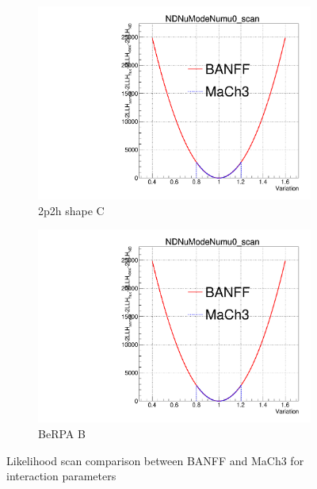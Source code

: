 \begin{figure}[h]
	\begin{subfigure}[t]{0.24\textwidth}
		\includegraphics[width=\textwidth, trim={0mm 0mm 0mm 11mm}, clip, page=113]{figures/mach3/banff/Asimov_scan_20July_flux_Full_LLHscan_18July_BeRPA_U_ND280logL_scan}
		\caption{2p2h shape C}
	\end{subfigure}
	\begin{subfigure}[t]{0.24\textwidth}
		\includegraphics[width=\textwidth, trim={0mm 0mm 0mm 11mm}, clip, page=116]{figures/mach3/banff/Asimov_scan_20July_flux_Full_LLHscan_18July_BeRPA_U_ND280logL_scan}
		\caption{BeRPA B}
	\end{subfigure}
	\caption{Likelihood scan comparison between BANFF and MaCh3 for interaction parameters}
	\label{fig:banff_asimov_scan_xsec}
\end{figure}

